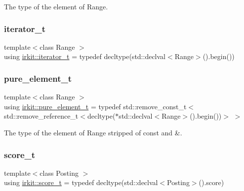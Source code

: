 The type of the element of Range. 

\mbox{\label{namespaceirkit_af390a50be8f636e7239c650e5043c56f}} 
\subsubsection{\texorpdfstring{iterator\+\_\+t}{iterator\_t}}
{\footnotesize\ttfamily template$<$class Range $>$ \\
using \hyperlink{namespaceirkit_af390a50be8f636e7239c650e5043c56f}{irkit\+::iterator\+\_\+t} = typedef decltype(std\+::declval$<$Range$>$().begin())}

\mbox{\label{namespaceirkit_afcffab67300c5c703cb38a363c9a6f1d}} 
\subsubsection{\texorpdfstring{pure\+\_\+element\+\_\+t}{pure\_element\_t}}
{\footnotesize\ttfamily template$<$class Range $>$ \\
using \hyperlink{namespaceirkit_afcffab67300c5c703cb38a363c9a6f1d}{irkit\+::pure\+\_\+element\+\_\+t} = typedef std\+::remove\+\_\+const\+\_\+t$<$ std\+::remove\+\_\+reference\+\_\+t$<$decltype($\ast$std\+::declval$<$Range$>$().begin())$>$ $>$}



The type of the element of Range stripped of {\ttfamily const} and {\ttfamily \&}. 

\mbox{\label{namespaceirkit_a754dabe3346f950c948e7596d9d46c71}} 
\subsubsection{\texorpdfstring{score\+\_\+t}{score\_t}}
{\footnotesize\ttfamily template$<$class Posting $>$ \\
using \hyperlink{namespaceirkit_a754dabe3346f950c948e7596d9d46c71}{irkit\+::score\+\_\+t} = typedef decltype(std\+::declval$<$Posting$>$().score)}

